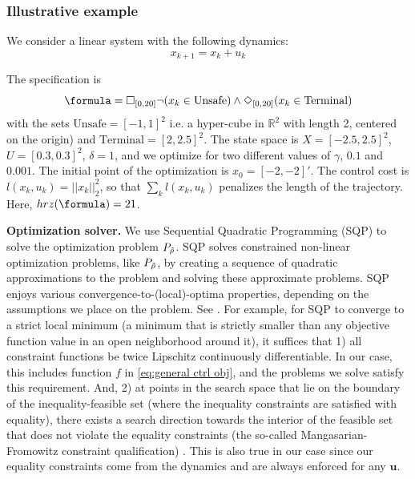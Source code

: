 \subsubsection{Illustrative example}
\label{sec:illustrative example}
We consider a linear system with the following dynamics:
\begin{equation}
\label{eq:PointMass}
x_{k+1} = x_k + u_k
\end{equation}

The specification is 
\[\formula = \always_{[0,20]} \neg (x_k \in \text{Unsafe}) \land \eventually_{[0,20]} (x_k \in \text{Terminal})\]
with the sets $\text{Unsafe}=[-1,1]^2$ i.e. a hyper-cube in $\mathbb{R}^2$ with length 2, centered on the origin) and $\text{Terminal}=[2,2.5]^2$. 
The state space is $X=[-2.5,2.5]^2$, $U=[0.3,0.3]^2$, $\delta=1$, and we optimize for two different values of $\gamma$, $0.1$ and $0.001$. 
The initial point of the optimization is $x_0=[-2,-2]'$. 
The control cost is $l(x_k,u_k) = ||x_k||_{2}^2$, so that $\sum_kl(x_k,u_k)$ penalizes the length of the trajectory. Here, $hrz(\formula) = 21$.

\textbf{Optimization solver.}
We use Sequential Quadratic Programming (SQP) to solve the optimization problem $P_{\tilde{\rho}}$.
SQP solves constrained non-linear optimization problems, like $P_{\tilde{\rho}}$, by creating a sequence of quadratic approximations to the problem and solving these approximate problems.
SQP enjoys various convergence-to-(local)-optima properties, depending on the assumptions we place on the problem. 
See \cite[Section 2.9]{Polak97_Optim}.
For example, for SQP to converge to a strict local minimum (a minimum that is strictly smaller than any objective function value in an open neighborhood around it), it suffices that 
1) all constraint functions be twice Lipschitz continuously differentiable. 
In our case, this includes function $f$ in \eqref{eq:general ctrl obj}, and the problems we solve satisfy this requirement.
And, 
2) at points in the search space that lie on the boundary of the inequality-feasible set (where the inequality constraints are satisfied with equality), there exists a search direction towards the interior of the feasible set that does not violate the equality constraints (the so-called Mangasarian-Fromowitz constraint qualification) \cite[Assumption 2.9.1]{Polak97_Optim}.
This is also true in our case since our equality constraints come from the dynamics and are always enforced for any $\mathbf{u}$.

